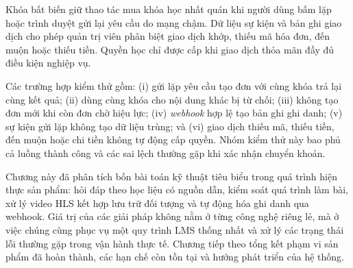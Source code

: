 \documentclass[../DoAn.tex]{subfiles}
\begin{document}
Khóa bất biến giữ thao tác mua khóa học nhất quán khi người dùng bấm lặp hoặc trình duyệt gửi lại yêu cầu do mạng chậm. Dữ liệu sự kiện và bản ghi giao dịch cho phép quản trị viên phân biệt giao dịch khớp, thiếu mã hóa đơn, đến muộn hoặc thiếu tiền. Quyền học chỉ được cấp khi giao dịch thỏa mãn đầy đủ điều kiện nghiệp vụ.

Các trường hợp kiểm thử gồm: (i) gửi lặp yêu cầu tạo đơn với cùng khóa trả lại cùng kết quả; (ii) dùng cùng khóa cho nội dung khác bị từ chối; (iii) không tạo đơn mới khi còn đơn chờ hiệu lực; (iv) \textit{webhook} hợp lệ tạo bản ghi ghi danh; (v) sự kiện gửi lặp không tạo dữ liệu trùng; và (vi) giao dịch thiếu mã, thiếu tiền, đến muộn hoặc chi tiền không tự động cấp quyền. Nhóm kiểm thử này bao phủ cả luồng thành công và các sai lệch thường gặp khi xác nhận chuyển khoản.

Chương này đã phân tích bốn bài toán kỹ thuật tiêu biểu trong quá trình hiện thực sản phẩm: hỏi đáp theo học liệu có nguồn dẫn, kiểm soát quá trình làm bài, xử lý video HLS kết hợp lưu trữ đối tượng và tự động hóa ghi danh qua webhook. Giá trị của các giải pháp không nằm ở từng công nghệ riêng lẻ, mà ở việc chúng cùng phục vụ một quy trình LMS thống nhất và xử lý các trạng thái lỗi thường gặp trong vận hành thực tế. Chương tiếp theo tổng kết phạm vi sản phẩm đã hoàn thành, các hạn chế còn tồn tại và hướng phát triển của hệ thống.
\end{document}
